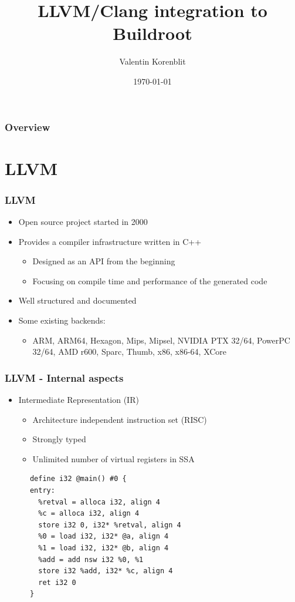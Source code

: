 \documentclass{beamer}
\title[LLVM/Clang + Buildroot]{LLVM/Clang integration to Buildroot}
\author{Valentin Korenblit}
\institute[Smile]
{
Smile \\~\\
\medskip
\textit{valentin.korenblit@smile.fr}
}
\date{\today}
\begin{document}
\begin{frame}
\titlepage
\end{frame}

\begin{frame}
\frametitle{Overview}
\tableofcontents
\end{frame}


\section{LLVM}

\begin{frame}
\frametitle{LLVM}
\begin{itemize}
  \item Open source project started in 2000
  \item Provides a compiler infrastructure written in C++
  \begin{itemize}
    \item Designed as an API from the beginning
    \item Focusing on compile time and performance of the generated code
  \end{itemize}
  \item Well structured and documented
  \item Some existing backends:
  \begin{itemize}
    \item ARM, ARM64, Hexagon, Mips, Mipsel, NVIDIA PTX 32/64, PowerPC 32/64, AMD r600, Sparc, Thumb, x86, x86-64, XCore
  \end{itemize}
\end{itemize}
\end{frame}

\begin{frame}[fragile]
\frametitle{LLVM - Internal aspects}
\begin{itemize}
  \item Intermediate Representation (IR)
  \begin{itemize}
    \item Architecture independent instruction set (RISC)
    \item Strongly typed
    \item Unlimited number of virtual registers in SSA
  \end{itemize}
\end{itemize}

\begin{lstlisting}
      define i32 @main() #0 {
      entry:
        %retval = alloca i32, align 4
        %c = alloca i32, align 4
        store i32 0, i32* %retval, align 4
        %0 = load i32, i32* @a, align 4
        %1 = load i32, i32* @b, align 4
        %add = add nsw i32 %0, %1
        store i32 %add, i32* %c, align 4
        ret i32 0
      }
\end{lstlisting}

\end{frame}
\end{document}

